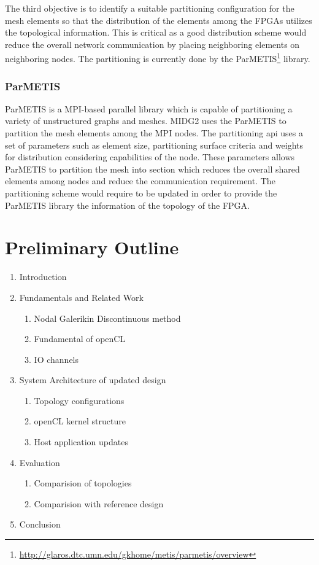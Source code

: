 \documentclass[english,notitlepage]{hgbreport}
\begin{document}
The third objective is to identify a suitable partitioning configuration for the mesh elements so that
the distribution of the elements among the FPGAs utilizes the topological information. This is critical
as a good distribution scheme would reduce the overall network communication by placing neighboring elements
on neighboring nodes. The partitioning is currently done by the ParMETIS\footnote{\url{http://glaros.dtc.umn.edu/gkhome/metis/parmetis/overview}}
library. 

\subsubsection{ParMETIS}

ParMETIS is a MPI-based parallel library which is capable of partitioning a variety of unstructured graphs and meshes. MIDG2
uses the ParMETIS to partition the mesh elements among the MPI nodes. The partitioning api uses a set of parameters such as element
size, partitioning surface criteria and weights for distribution considering capabilities of the node. These parameters allows
ParMETIS to partition the mesh into section which reduces the overall shared elements among nodes and reduce the communication requirement.
The partitioning scheme would require to be updated in order to provide the ParMETIS library the information of the topology of the FPGA.

\section{Preliminary Outline}
\begin{enumerate}
	\item Introduction
	\item Fundamentals and Related Work
	\begin{enumerate}
		\item Nodal Galerikin Discontinuous method
		\item Fundamental of openCL
		\item IO channels
	\end{enumerate}
	\item System Architecture of updated design
	\begin{enumerate}
		\item Topology configurations
		\item openCL kernel structure
		\item Host application updates
	\end{enumerate}
	\item Evaluation
	\begin{enumerate}
		\item Comparision of topologies
		\item Comparision with reference design
	\end{enumerate}
	\item Conclusion

\end{enumerate}
\end{document}
